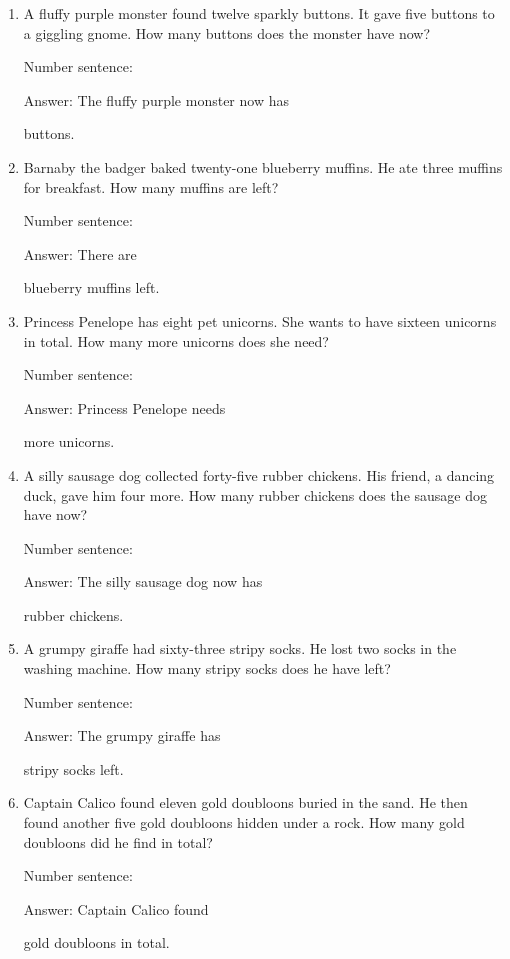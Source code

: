 \documentclass{tufte-book}
\begin{document}
\begin{enumerate}

\item
  A fluffy purple monster found twelve sparkly buttons. It gave five
  buttons to a giggling gnome. How many buttons does the monster have
  now?\medskip\par
  Number sentence:
  \dotfill\medskip\par
  Answer: The fluffy purple monster now has
  \dotfill\medskip\par\mbox{}\dotfill\medskip\par\mbox{}\dotfill\bigskip
  buttons.
\item
  Barnaby the badger baked twenty-one blueberry muffins. He ate three
  muffins for breakfast. How many muffins are left?\medskip\par
  Number sentence:
  \dotfill\medskip\par
  Answer: There are
  \dotfill\medskip\par\mbox{}\dotfill\medskip\par\mbox{}\dotfill\bigskip
  blueberry muffins left.
\item
  Princess Penelope has eight pet unicorns. She wants to have sixteen
  unicorns in total. How many more unicorns does she need?\medskip\par
  Number sentence:
  \dotfill\medskip\par
  Answer: Princess Penelope needs
  \dotfill\medskip\par\mbox{}\dotfill\medskip\par\mbox{}\dotfill\bigskip
  more unicorns.
\item
  A silly sausage dog collected forty-five rubber chickens. His friend,
  a dancing duck, gave him four more. How many rubber chickens does the
  sausage dog have now?\medskip\par
  Number sentence:
  \dotfill\medskip\par
  Answer: The silly sausage dog now has
  \dotfill\medskip\par\mbox{}\dotfill\medskip\par\mbox{}\dotfill\bigskip
  rubber chickens.
\item
  A grumpy giraffe had sixty-three stripy socks. He lost two socks in
  the washing machine. How many stripy socks does he have left?\medskip\par
  Number sentence:
  \dotfill\medskip\par
  Answer: The grumpy giraffe has
  \dotfill\medskip\par\mbox{}\dotfill\medskip\par\mbox{}\dotfill\bigskip
  stripy socks left.
\item
  Captain Calico found eleven gold doubloons buried in the sand. He then
  found another five gold doubloons hidden under a rock. How many gold
  doubloons did he find in total?\medskip\par
  Number sentence:
  \dotfill\medskip\par
  Answer: Captain Calico found
  \dotfill\medskip\par\mbox{}\dotfill\medskip\par\mbox{}\dotfill\bigskip
  gold doubloons in total.
\end{enumerate}
\end{document}
